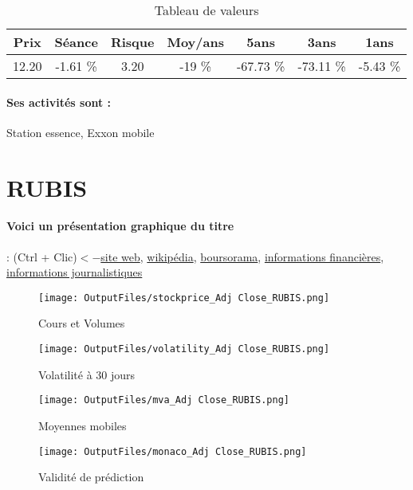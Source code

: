 \documentclass[11pt,a4paper]{report}%
\begin{document}
\begin{table}[H]
  \centering
    \begin{tabular}{|c|c|c|c|c|c|c|}
    \hline
    Prix & Séance & Risque  & Moy/ans & 5ans & 3ans & 1ans \\
    \hline
    12.20 &    -1.61 \%    & 3.20 & -19 \% & -67.73 \% & -73.11 \% & -5.43 \% \\
    \hline
    \end{tabular}%
        \label{tab:table_ESSO}%
      \caption{Tableau de valeurs}
\end{table}%

\paragraph{Ses activités sont : } Station essence, Exxon mobile 
    
    \newpage

\section{RUBIS}

\paragraph{Voici un présentation graphique du titre} : (Ctrl + Clic)$<-$\href{https://rubis.fr/fr/finance/agenda/}{site web}, \href{https://fr.wikipedia.org/wiki/Rubis_(entreprise)}{wikipédia}, \href{https://www.boursorama.com/cours/1rPRUI}{boursorama}, \href{https://www.qwant.com/?q=site:https:%2f%2fwww.easybourse.com%2faction-societe%2fRUBIS&t=web&client=ext-firefox-hp}{informations financières}, \href{https://bourse.lerevenu.com/cours-de-bourse/fiche-valeur-synthese/RUBIS/RUI-FR}{informations journalistiques}
\begin{figure}[!htb]
   \begin{minipage}{0.5\textwidth}
     \centering
     \texttt{[image: OutputFiles/stockprice\_Adj Close\_RUBIS.png]}
     \caption{Cours et Volumes}\label{Fig:price_RUBIS}
   \end{minipage}\hfill
   \begin{minipage}{0.5\textwidth}
     \centering
     \texttt{[image: OutputFiles/volatility\_Adj Close\_RUBIS.png]}
     \caption{Volatilité à 30 jours}\label{Fig:volat_RUBIS}
   \end{minipage}
\end{figure}
\begin{figure}[!htb]
   \begin{minipage}{0.5\textwidth}
     \centering
     \texttt{[image: OutputFiles/mva\_Adj Close\_RUBIS.png]}
     \caption{Moyennes mobiles}\label{Fig:mva_RUBIS}
   \end{minipage}\hfill
   \begin{minipage}{0.5\textwidth}
     \centering
     \texttt{[image: OutputFiles/monaco\_Adj Close\_RUBIS.png]}
     \caption{Validité de prédiction}\label{Fig:prediction_RUBIS}
   \end{minipage}
\end{figure}
\end{document}
